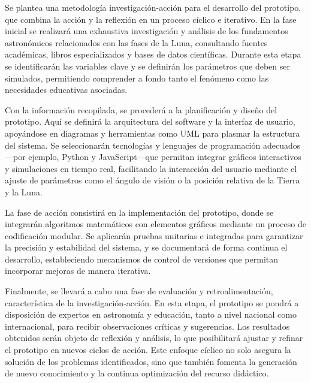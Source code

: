 Se plantea una metodología investigación-acción para el desarrollo del prototipo, que combina la acción y la reflexión en un proceso cíclico e iterativo. En la fase inicial se realizará una exhaustiva investigación y análisis de los fundamentos astronómicos relacionados con las fases de la Luna, consultando fuentes académicas, libros especializados y bases de datos científicas. Durante esta etapa se identificarán las variables clave y se definirán los parámetros que deben ser simulados, permitiendo comprender a fondo tanto el fenómeno como las necesidades educativas asociadas.

Con la información recopilada, se procederá a la planificación y diseño del prototipo. Aquí se definirá la arquitectura del software y la interfaz de usuario, apoyándose en diagramas y herramientas como UML para plasmar la estructura del sistema. Se seleccionarán tecnologías y lenguajes de programación adecuados—por ejemplo, Python y JavaScript—que permitan integrar gráficos interactivos y simulaciones en tiempo real, facilitando la interacción del usuario mediante el ajuste de parámetros como el ángulo de visión o la posición relativa de la Tierra y la Luna.

La fase de acción consistirá en la implementación del prototipo, donde se integrarán algoritmos matemáticos con elementos gráficos mediante un proceso de codificación modular. Se aplicarán pruebas unitarias e integradas para garantizar la precisión y estabilidad del sistema, y se documentará de forma continua el desarrollo, estableciendo mecanismos de control de versiones que permitan incorporar mejoras de manera iterativa.

Finalmente, se llevará a cabo una fase de evaluación y retroalimentación, característica de la investigación-acción. En esta etapa, el prototipo se pondrá a disposición de expertos en astronomía y educación, tanto a nivel nacional como internacional, para recibir observaciones críticas y sugerencias. Los resultados obtenidos serán objeto de reflexión y análisis, lo que posibilitará ajustar y refinar el prototipo en nuevos ciclos de acción. Este enfoque cíclico no solo asegura la solución de los problemas identificados, sino que también fomenta la generación de nuevo conocimiento y la continua optimización del recurso didáctico.
